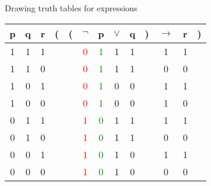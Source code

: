 \documentclass[
  ignorenonframetext,
]{beamer}
\begin{document}
\begin{frame}{Drawing truth tables for expressions}
\protect\hypertarget{drawing-truth-tables-for-expressions-1}{}

\begin{tabular}{@{ }c@{ }@{ }c@{ }@{ }c | c@{}@{}c@{}@{ }c@{ }@{ }c@{ }@{ }c@{ }@{ }c@{ }@{}c@{}@{ }c@{ }@{ }c@{ }@{}c@{ }}
p & q & r & ( & ( & $\neg$ & p & $\vee$ & q & ) & $\rightarrow$ & r & )\\
\hline 
1 & 1 & 1 &  &  & \textcolor{red}{0} & \textcolor{green}{1} & 1 & 1 &  & 1 & 1 & \\
1 & 1 & 0 &  &  & \textcolor{red}{0} & \textcolor{green}{1} & 1 & 1 &  & 0 & 0 & \\
1 & 0 & 1 &  &  & \textcolor{red}{0} & \textcolor{green}{1} & 0 & 0 &  & 1 & 1 & \\
1 & 0 & 0 &  &  & \textcolor{red}{0} & \textcolor{green}{1} & 0 & 0 &  & 1 & 0 & \\
0 & 1 & 1 &  &  & \textcolor{red}{1} & \textcolor{green}{0} & 1 & 1 &  & 1 & 1 & \\
0 & 1 & 0 &  &  & \textcolor{red}{1} & \textcolor{green}{0} & 1 & 1 &  & 0 & 0 & \\
0 & 0 & 1 &  &  & \textcolor{red}{1} & \textcolor{green}{0} & 1 & 0 &  & 1 & 1 & \\
0 & 0 & 0 &  &  & \textcolor{red}{1} & \textcolor{green}{0} & 1 & 0 &  & 0 & 0 & \\
\end{tabular}

\end{frame}
\end{document}

